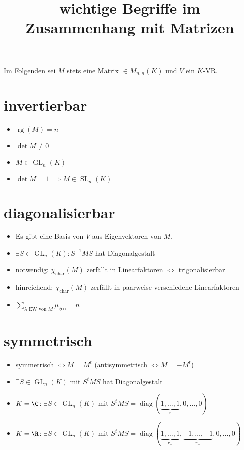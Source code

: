 \documentclass{article}
\title{wichtige Begriffe im Zusammenhang mit Matrizen}
\begin{document}
Im Folgenden sei $M$ stets eine Matrix $\in M_{n, n}(K)$ und $V$ ein $K$-VR.
    \section{invertierbar}
    \begin{itemize}
        \item $\operatorname{rg}(M) = n$
        \item $\det M \neq 0$
        \item $M\in \operatorname{GL}_n(K)$
        \item $\det M = 1 \implies M \in \operatorname{SL}_n(K)$
    \end{itemize}
    \section{diagonalisierbar}
    \begin{itemize}
        \item Es gibt eine Basis von $V$ aus Eigenvektoren von $M$.
        \item $\exists S \in \operatorname{GL}_n(K): S^{-1} M S$ hat Diagonalgestalt
        \item notwendig: $\chi_\text{char} (M)$ zerfällt in Linearfaktoren $\Leftrightarrow$ trigonalisierbar
        \item hinreichend: $\chi_\text{char} (M)$ zerfällt in paarweise verschiedene Linearfaktoren
        \item $\displaystyle \sum_{\lambda\text{ EW von } M}\mu_\text{geo} = n$
    \end{itemize}
    \section{symmetrisch}
    \begin{itemize}
        \item symmetrisch $\Leftrightarrow M = M^t$ (antisymmetrisch $\Leftrightarrow M = -M^t$)
        \item $\exists S \in \operatorname{GL}_n(K)$ mit $S^t M S$ hat Diagonalgestalt
        \item $K = \C$: $\exists S \in \operatorname{GL}_n(K)$ mit $S^t M S = \operatorname{diag}(\underbrace{1,\dots,1}_{r},0,\dots, 0)$
        \item $K = \R$: $\exists S \in \operatorname{GL}_n(K)$ mit $S^t M S = \operatorname{diag}(\underbrace{1,\dots,1}_{r_+},\underbrace{-1,\dots, -1}_{r_-},0,\dots, 0)$
    \end{itemize}
\end{document}
